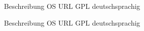 




{Beschreibung}
{OS}
{URL}
{GPL}
{deutschsprachig}


{Beschreibung}
{OS}
{URL}
{GPL}
{deutschsprachig}

\backpage

